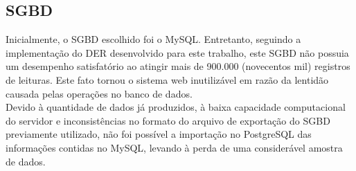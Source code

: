 \subsection{\acrlong{SGBD}}
\quad Inicialmente, o \acrshort{SGBD} escolhido foi o MySQL. Entretanto, seguindo a implementação do \acrshort{DER} desenvolvido para este trabalho, este \acrlong{SGBD} não possuia um desempenho satisfatório ao atingir mais de 900.000 (novecentos mil) registros de leituras. Este fato tornou o sistema web inutilizável em razão da lentidão causada pelas operações no banco de dados.
\\\null \quad Devido à quantidade de dados já produzidos, à baixa capacidade computacional do servidor e  inconsistências no formato do arquivo de exportação do \acrshort{SGBD} previamente utilizado, não foi possível a importação no PostgreSQL das informações contidas no MySQL, levando à perda de uma considerável amostra de dados.
